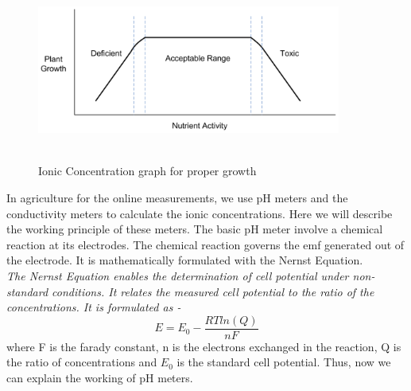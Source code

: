 \documentclass[11pt]{article}
\begin{document}
\begin{figure}[h]
  \centering
    \vspace*{0 cm}
  \includegraphics[height=60mm,width=100mm]{picc.png}
    \caption{Ionic Concentration graph for proper growth}
  \label{fig:Soil Moisture Sensor}
\end{figure}
In agriculture for the online measurements, we use pH meters and the conductivity meters to calculate the ionic concentrations. Here we will describe the working principle of these meters. The basic pH meter involve a chemical reaction at its electrodes. The chemical reaction governs the emf generated out of the electrode. It is mathematically formulated with the Nernst Equation.\\
\textit{The Nernst Equation enables the determination of cell potential under non-standard conditions. It relates the measured cell potential to the ratio of the concentrations. It is formulated as -}
\begin{equation} \label{eq:1}
E = E_0 - \frac{RT ln(Q)}{nF}
\end{equation}
where F is the farady constant, n is the electrons exchanged in the reaction, Q is the ratio of concentrations and \(E_0\) is the standard cell potential. Thus, now we can explain the working of pH meters. \\
\end{document}
